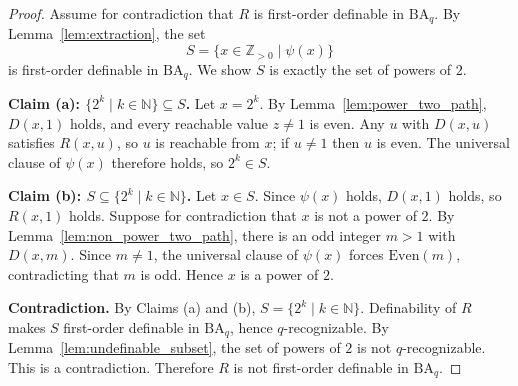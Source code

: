 \documentclass[10pt,a4paper]{amsart}
\begin{document}
\begin{proof}
Assume for contradiction that $R$ is first-order definable in
$\mathrm{BA}_q$. By Lemma~\ref{lem:extraction}, the set
\[
S = \{x \in \mathbb{Z}_{>0} \mid \psi(x)\}
\]
is first-order definable in $\mathrm{BA}_q$. We show $S$ is exactly the
set of powers of $2$.

\medskip
\noindent\textbf{Claim (a): $\{2^k \mid k \in \mathbb{N}\} \subseteq S$.}
Let $x = 2^k$. By Lemma~\ref{lem:power_two_path}, $D(x,1)$ holds, and
every reachable value $z \ne 1$ is even. Any $u$ with $D(x,u)$ satisfies
$R(x,u)$, so $u$ is reachable from $x$; if $u \ne 1$ then $u$ is even.
The universal clause of $\psi(x)$ therefore holds, so $2^k \in S$.

\medskip
\noindent\textbf{Claim (b): $S \subseteq \{2^k \mid k \in \mathbb{N}\}$.}
Let $x \in S$. Since $\psi(x)$ holds, $D(x,1)$ holds, so $R(x,1)$ holds.
Suppose for contradiction that $x$ is not a power of $2$. By
Lemma~\ref{lem:non_power_two_path}, there is an odd integer $m > 1$ with
$D(x,m)$. Since $m \ne 1$, the universal clause of $\psi(x)$ forces
$\mathrm{Even}(m)$, contradicting that $m$ is odd. Hence $x$ is a power
of $2$.

\medskip
\noindent\textbf{Contradiction.}
By Claims (a) and (b), $S = \{2^k \mid k \in \mathbb{N}\}$. Definability
of $R$ makes $S$ first-order definable in $\mathrm{BA}_q$, hence
$q$-recognizable. By Lemma~\ref{lem:undefinable_subset}, the set of
powers of $2$ is not $q$-recognizable. This is a contradiction.
Therefore $R$ is not first-order definable in $\mathrm{BA}_q$.
\end{proof}
\end{document}
